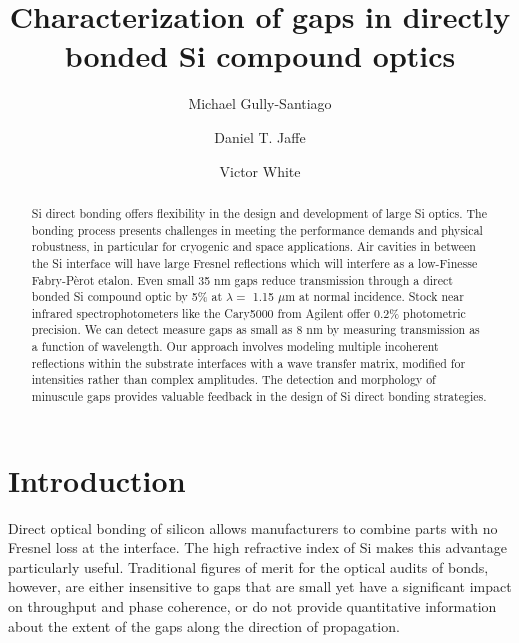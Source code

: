 \documentclass[osajnl,preprint,showpacs,superscriptaddress,12pt]{revtex4-1} %
\begin{document}
\title{Characterization of gaps in directly bonded Si compound optics}

\author{Michael Gully-Santiago}
\author{Daniel T. Jaffe}

\author{Victor White}


\begin{abstract}
Si direct bonding offers flexibility in the design and development of large Si optics.  The bonding process presents challenges in meeting the performance demands and physical robustness, in particular for cryogenic and space applications.  Air cavities in between the Si interface will have large Fresnel reflections which will interfere as a low-Finesse Fabry-P\`erot etalon.  Even small 35 nm gaps reduce transmission through a direct bonded Si compound optic by 5\% at $\lambda = $ 1.15 $\mu$m at normal incidence.  Stock near infrared spectrophotometers like the Cary5000 from Agilent offer 0.2\% photometric precision.  We can detect measure gaps as small as 8 nm by measuring transmission as a function of wavelength.  Our approach involves modeling multiple incoherent reflections within the substrate interfaces with a wave transfer matrix, modified for intensities rather than complex amplitudes.  The detection and morphology of minuscule gaps provides valuable feedback in the design of Si direct bonding strategies.
\end{abstract}


\maketitle %

\section{Introduction}

Direct optical bonding of silicon allows manufacturers to combine parts with no Fresnel loss at the interface.  The high refractive index of Si makes this advantage particularly useful.  Traditional figures of merit for the optical audits of bonds, however, are either insensitive to gaps that are small yet have a significant impact on throughput and phase coherence, or do not provide quantitative information about the extent of the gaps along the direction of propagation.
\end{document}
